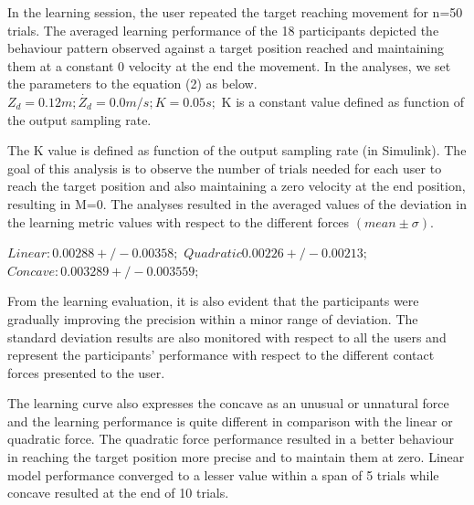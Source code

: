 In the learning session, the user repeated the target reaching movement for n=50 trials. The averaged learning performance of the 18 participants depicted the behaviour pattern observed against a target position reached and maintaining them at a constant 0 velocity at the end the movement. 
In the analyses, we set the parameters to the equation (2) as below.
$Z_d=0.12  m;\dot{Z_d}=0.0  m/s;K=0.05 s ;$
K is a constant value defined as function of the output sampling rate.

The K value is defined as function of the output sampling rate (in Simulink). The goal of this analysis is to observe the number of trials needed for each user to reach the target position and also maintaining a zero velocity at the end position, resulting in M=0. The analyses resulted in the averaged values of the deviation in the learning metric values with respect to the different forces $(mean\pm \sigma)$.

$Linear : 0.00288 +/- 0.00358;$ 
$Quadratic 0.00226 +/- 0.00213;$
$Concave : 0.003289 +/-  0.003559;$ 

From the learning evaluation, it is also evident that the participants were gradually improving the precision within a minor range of deviation. The standard deviation results are also monitored with respect to all the users and represent the participants’ performance with respect to the different contact forces presented to the user. 

The learning curve also expresses the concave as an unusual or unnatural force and the learning performance is quite different in comparison with the linear or quadratic force. The quadratic force performance resulted in a better behaviour in reaching the target position more precise and to maintain them at zero. Linear model performance converged to a lesser value within a span of 5 trials while concave resulted at the end of 10 trials. 

